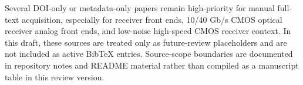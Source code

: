 Several DOI-only or metadata-only papers remain high-priority for manual full-text acquisition, especially for receiver front ends, 10/40 Gb/s CMOS optical receiver analog front ends, and low-noise high-speed CMOS receiver context. In this draft, these sources are treated only as future-review placeholders and are not included as active BibTeX entries. Source-scope boundaries are documented in repository notes and README material rather than compiled as a manuscript table in this review version.
